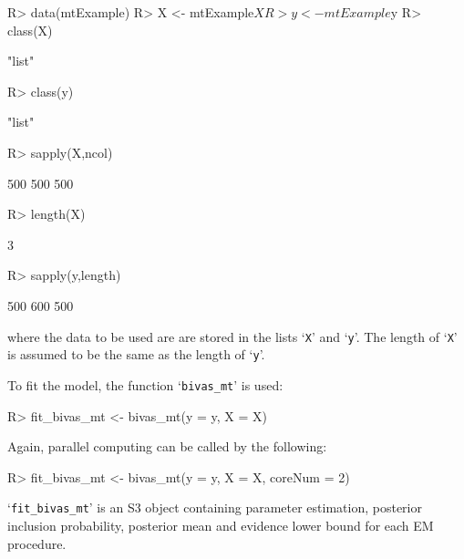 \documentclass[11pt]{article}
\begin{document}
\begin{Schunk}
\begin{Sinput}
R> data(mtExample)
R> X <- mtExample$X
R> y <- mtExample$y
R> class(X)
\end{Sinput}
\begin{Soutput}
[1] "list"
\end{Soutput}
\begin{Sinput}
R> class(y)
\end{Sinput}
\begin{Soutput}
[1] "list"
\end{Soutput}
\begin{Sinput}
R> sapply(X,ncol)
\end{Sinput}
\begin{Soutput}
[1] 500 500 500
\end{Soutput}
\begin{Sinput}
R> length(X)
\end{Sinput}
\begin{Soutput}
[1] 3
\end{Soutput}
\begin{Sinput}
R> sapply(y,length)
\end{Sinput}
\begin{Soutput}
[1] 500 600 500
\end{Soutput}
\end{Schunk}
where the data to be used are are stored in the lists `\texttt{X}' and `\texttt{y}'. The length of `\texttt{X}' is assumed to be the same as the length of `\texttt{y}'.

To fit the model, the function `\texttt{bivas\_mt}' is used:
\begin{Schunk}
\begin{Sinput}
R> fit_bivas_mt <- bivas_mt(y = y, X = X)
\end{Sinput}
\end{Schunk}

Again, parallel computing can be called by the following:
\begin{Schunk}
\begin{Sinput}
R> fit_bivas_mt <- bivas_mt(y = y, X = X, coreNum = 2)
\end{Sinput}
\end{Schunk}

`\texttt{fit\_bivas\_mt}' is an S3 object containing parameter estimation, posterior inclusion probability, posterior mean and evidence lower bound for each EM procedure.
\end{document}
